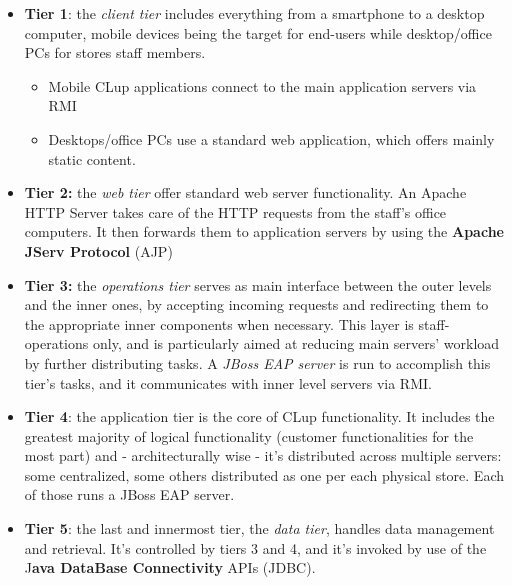 \begin{itemize}
    \item \textbf{Tier 1}: the \textit{client tier} includes everything from a smartphone to a desktop computer, mobile devices being the target for end-users while desktop/office PCs for stores staff members. 
    \begin{itemize}
        \item Mobile CLup applications connect to the main application servers via RMI
        \item Desktops/office PCs use a standard web application, which offers mainly static content.
    \end{itemize}
    \item \textbf{Tier 2:} the \textit{web tier} offer standard web server functionality. An Apache HTTP Server takes care of the HTTP requests from the staff's office computers. It then forwards them to application servers by using the \textbf{Apache JServ Protocol} (AJP)
    \item \textbf{Tier 3:} the \textit{operations tier} serves as main interface between the outer levels and the inner ones, by accepting incoming requests and redirecting them to the appropriate inner components when necessary. This layer is staff-operations only, and is particularly aimed at reducing main servers' workload by further distributing tasks. A \textit{JBoss EAP server} is run to accomplish this tier's tasks, and it communicates with inner level servers via RMI.
    \item \textbf{Tier 4}: the application tier is the core of CLup functionality. It includes the greatest majority of logical functionality (customer functionalities for the most part) and - architecturally wise - it's distributed across multiple servers: some centralized, some others distributed as one per each physical store. Each of those runs a JBoss EAP server. 
    \item \textbf{Tier 5}: the last and innermost tier, the \textit{data tier}, handles data management and retrieval. It's controlled by tiers 3 and 4, and it's invoked by use of the J\textbf{ava DataBase Connectivity} APIs (JDBC).

\end{itemize}

